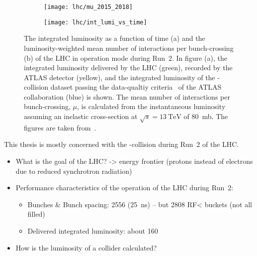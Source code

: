\begin{figure}[htbp]
  \centering

  \begin{subfigure}{0.47\textwidth}
    \texttt{[image: lhc/mu\_2015\_2018]}
    \subcaption{}%
    \label{fig:atlas_mu}
  \end{subfigure}\hspace*{0.02\textwidth}%
  \begin{subfigure}{0.47\textwidth}
    \texttt{[image: lhc/int\_lumi\_vs\_time]}
    \subcaption{}%
    \label{fig:atlas_int_lumi_vs_time}
  \end{subfigure}

  \caption{The integrated luminosity as a function of time (a) and the
    luminosity-weighted mean number of interactions per bunch-crossing (b) of
    the LHC in \pp operation mode during Run~2. In figure (a), the integrated
    luminosity delivered by the LHC (green), recorded by the ATLAS detector
    (yellow), and the integrated luminosity of the \pp-collision dataset passing
    the data-qualtiy criteria~\cite{DAPR-2018-01} of the ATLAS collaboration
    (blue) is shown. The mean number of interactions per bunch-crossing, $\mu$,
    is calculated from the instantaneous luminosity assuming an inelastic \pp
    cross-section at $\sqrt{s} = \SI{13}{\TeV}$ of \SI{80}{\milli\barn}. The
    figures are taken from~\cite{atlas_luminosity_summary_plots}.}%
  \label{fig:lumi_and_pu}
\end{figure}

This thesis is mostly concerned with the \pp-collision during Run~2 of the LHC.



\begin{itemize}

\item What is the goal of the LHC? -> energy frontier (protons instead of
  electrons due to reduced synchrotron radiation)

\item Performance characteristics of the \pp operation of the LHC during Run~2:

  \begin{itemize}
  \item Bunches \& Bunch spacing: 2556 (\SI{25}{\nano\second}) -- but 2808 RF<
    buckets (not all filled)

  \item Delivered integrated luminosity: about \SI{160}{\ifb}
    \end{itemize}

  \item How is the luminosity of a collider calculated?

\end{itemize}


